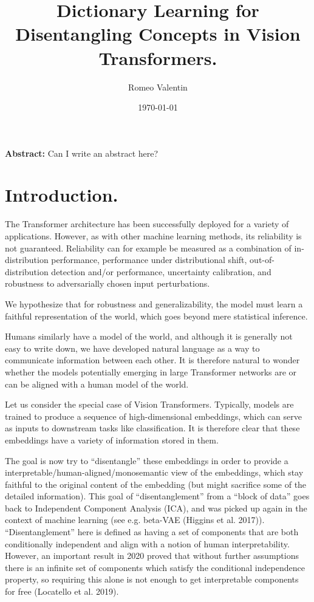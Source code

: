 \documentclass[11pt]{article}
\author{Romeo Valentin}
\date{\today}
\title{Dictionary Learning for Disentangling Concepts in Vision Transformers.}
\makeatletter
\newcommand{\cslcitation}[2]
 {\protect\hyper@linkstart{cite}{citeproc_bib_item_#1}#2\hyper@linkend}
\makeatother
\begin{document}
\maketitle
\tableofcontents

\textbf{Abstract:} Can I write an abstract here?
\section{Introduction.}
\label{sec:orgcb6d159}
The Transformer architecture has been successfully deployed for a variety of applications.
However, as with other machine learning methods, its reliability is not guaranteed.
Reliability can for example be measured as a combination of in-distribution performance, performance under distributional shift, out-of-distribution detection and/or performance, uncertainty calibration, and robustness to adversarially chosen input perturbations.

We hypothesize that for robustness and generalizability, the model must learn a faithful representation of the world, which goes beyond mere statistical inference.

Humans similarly have a model of the world, and although it is generally not easy to write down, we have developed natural language as a way to communicate information between each other.
It is therefore natural to wonder whether the models potentially emerging in large Transformer networks are or can be aligned with a human model of the world.

Let us consider the special case of Vision Transformers.
Typically, models are trained to produce a sequence of high-dimensional embeddings, which can serve as inputs to downstream tasks like classification.
It is therefore clear that these embeddings have a variety of information stored in them.

The goal is now try to ``disentangle'' these embeddings in order to provide a interpretable/human-aligned/monosemantic view of the embeddings, which stay faithful to the original content of the embedding (but might sacrifice some of the detailed information).
This goal of ``disentanglement'' from a ``block of data'' goes back to Independent Component Analysis (ICA), and was picked up again in the context of machine learning (see e.g. beta-VAE (\cslcitation{4}{Higgins et al. 2017})).
``Disentanglement'' here is defined as having a set of components that are both conditionally independent and align with a notion of human interpretability.
However, an important result in 2020 proved that without further assumptions there is an infinite set of components which satisfy the conditional independence property, so requiring this alone is not enough to get interpretable components for free (\cslcitation{5}{Locatello et al. 2019}).
\end{document}
